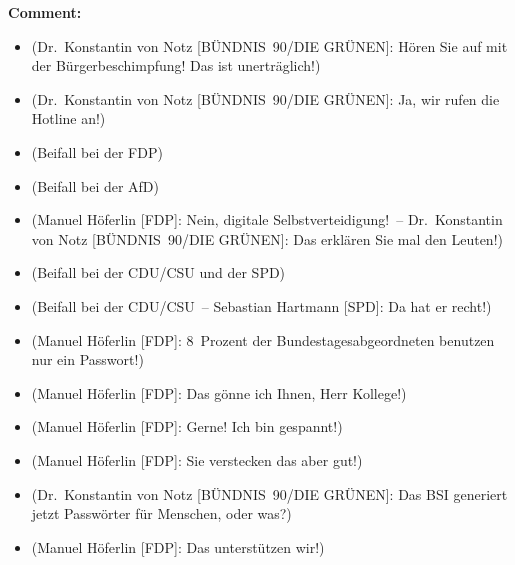 \documentclass{article}
\begin{document}
\noindent\textbf{Comment:}
\begin{itemize}
    \setlength\itemsep{-3pt}
    \item (Dr. Konstantin von Notz [BÜNDNIS 90/DIE GRÜNEN]: Hören Sie auf mit der Bürgerbeschimpfung! Das ist unerträglich!)
    \setlength\itemsep{-3pt}
    \item (Dr. Konstantin von Notz [BÜNDNIS 90/DIE GRÜNEN]: Ja, wir rufen die Hotline an!)
    \setlength\itemsep{-3pt}
    \item (Beifall bei der FDP)
    \setlength\itemsep{-3pt}
    \item (Beifall bei der AfD)
    \setlength\itemsep{-3pt}
    \item (Manuel Höferlin [FDP]: Nein, digitale Selbstverteidigung! – Dr. Konstantin von Notz [BÜNDNIS 90/DIE GRÜNEN]: Das erklären Sie mal den Leuten!)
    \setlength\itemsep{-3pt}
    \item (Beifall bei der CDU/CSU und der SPD)
    \setlength\itemsep{-3pt}
    \item (Beifall bei der CDU/CSU – Sebastian Hartmann [SPD]: Da hat er recht!)
    \setlength\itemsep{-3pt}
    \item (Manuel Höferlin [FDP]: 8 Prozent der Bundestagesabgeordneten benutzen nur ein Passwort!)
    \setlength\itemsep{-3pt}
    \item (Manuel Höferlin [FDP]: Das gönne ich Ihnen, Herr Kollege!)
    \setlength\itemsep{-3pt}
    \item (Manuel Höferlin [FDP]: Gerne! Ich bin gespannt!)
    \setlength\itemsep{-3pt}
    \item (Manuel Höferlin [FDP]: Sie verstecken das aber gut!)
    \setlength\itemsep{-3pt}
    \item (Dr. Konstantin von Notz [BÜNDNIS 90/DIE GRÜNEN]: Das BSI generiert jetzt Passwörter für Menschen, oder was?)
    \setlength\itemsep{-3pt}
    \item (Manuel Höferlin [FDP]: Das unterstützen wir!)
\end{itemize}
\end{document}
